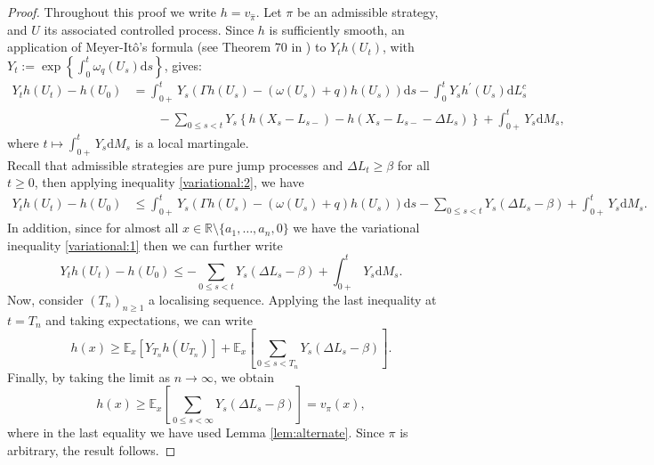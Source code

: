 \documentclass[10pt,a4paper]{amsart}
\newcommand{\e}{\mathbb{E}}
\newcommand{\reals}{\mathbb{R}}
\newcommand{\diff}{\mathrm{d}}
\newcommand{\homega}{\omega_q}
\newcommand{\BRA}[1]{{{\left\{#1\right\}}}} %
\newcommand{\SBRA}[1]{{{\left[#1\right]}}} %
\renewcommand{\leq}{\leqslant}
\renewcommand{\geq}{\geqslant}
\begin{document}
\begin{proof}
	Throughout this proof we write $h = v_{\hat{\pi}}$. Let $\pi$ be an admissible strategy, and $U$ its associated controlled process. Since $h$ is sufficiently smooth, an application of Meyer-It\^{o}'s formula (see Theorem 70 in \cite{protter_2004}) to $Y_t h(U_t)$, with $Y_t := \exp\BRA{\int_0^t \homega(U_s)\diff s}$, gives:
	\begin{align*}
		Y_t h(U_t) - h (U_0) &= \int_{0+}^t Y_s\left( \Gamma h (U_s) - (\omega(U_s)+q) h (U_s) \right) \diff s - \int_{0}^t Y_s h^{\prime} (U_s) \diff L^c_s \\
		& \qquad - \sum_{0 \leq s < t} Y_s \left\lbrace h (X_s-L_{s-}) - h (X_s - L_{s-} - \Delta L_s) \right\rbrace + \int_{0+}^t Y_s \diff M_s ,
	\end{align*}
	where $t \mapsto \int_{0+}^t Y_s \diff M_s$ is a local martingale.\\
	Recall that admissible strategies are pure jump processes and $\Delta L_t \geq \beta$ for all $t\geq 0$, then applying inequality \eqref{variational:2}, we have
	\begin{align*}
		Y_t h(U_t) - h (U_0) &\leq \int_{0+}^t Y_s\left( \Gamma h (U_s) - (\omega(U_s)+q) h (U_s) \right) \diff s - \sum_{0 \leq s < t} Y_s(\Delta L_s - \beta) + \int_{0+}^t Y_s \diff M_s.
	\end{align*}
	In addition, since for almost all $x \in \reals \setminus \{a_1,\dots,a_n,0\}$ we have the variational inequality \eqref{variational:1} then we can further write
	\[
	Y_t h(U_t) - h (U_0) \leq - \sum_{0 \leq s < t} Y_s(\Delta L_s - \beta) + \int_{0+}^t Y_s \diff M_s.
	\]
	Now, consider $(T_n)_{n\geq 1}$ a localising sequence. Applying the last inequality at $t=T_n$ and taking expectations, we can write
	\[
	h(x) \geq \e_x\SBRA{Y_{T_n} h(U_{T_n})} + \e_x\SBRA{ \sum_{0 \leq s < T_n} Y_s(\Delta L_s - \beta) }.
	\]
	Finally, by taking the limit as $n \to \infty$, we obtain
	\[
	h(x) \geq \e_x\SBRA{ \sum_{0 \leq s < \infty} Y_s(\Delta L_s - \beta) } = v_\pi(x),
	\]
	where in the last equality we have used Lemma \ref{lem:alternate}. Since $\pi$ is arbitrary, the result follows.

\end{proof}
\end{document}
